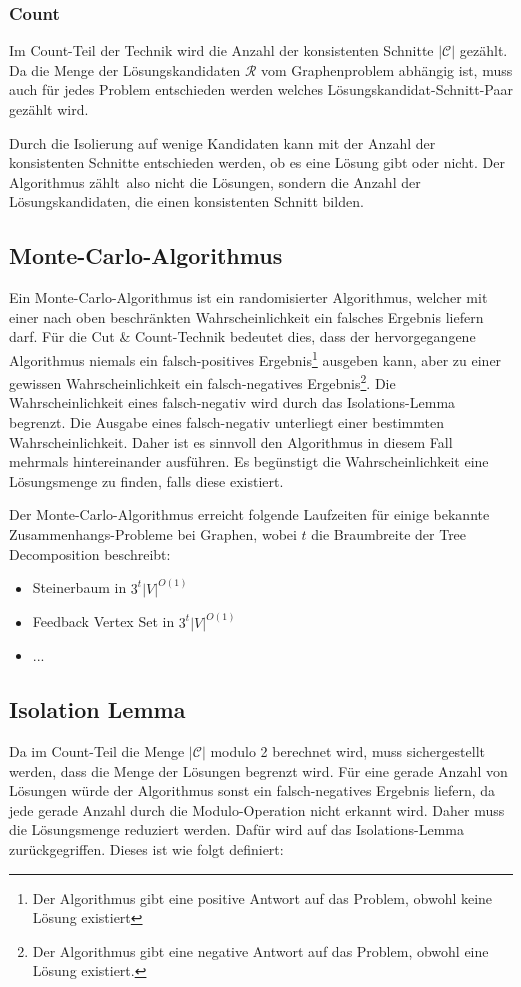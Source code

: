 \subsubsection{Count}
\label{ssec:cc_count}
Im Count-Teil der Technik wird die Anzahl der konsistenten Schnitte $|\mathcal{C}|$ gezählt.
Da die Menge der Lösungskandidaten $\mathcal{R}$ vom Graphenproblem abhängig ist, muss auch für jedes Problem entschieden werden welches Lösungskandidat-Schnitt-Paar gezählt wird.

Durch die Isolierung auf wenige Kandidaten kann mit der Anzahl der konsistenten Schnitte entschieden werden, ob es eine Lösung gibt oder nicht.
Der Algorithmus \glqq zählt\grqq ~also nicht die Lösungen, sondern die Anzahl der Lösungskandidaten, die einen konsistenten Schnitt bilden.

\subsection{Monte-Carlo-Algorithmus}
\label{sec:cc_monte}
Ein Monte-Carlo-Algorithmus ist ein randomisierter Algorithmus, welcher mit einer nach oben beschränkten Wahrscheinlichkeit ein falsches Ergebnis liefern darf. 
Für die Cut \& Count-Technik bedeutet dies, dass der hervorgegangene Algorithmus niemals ein falsch-positives Ergebnis\footnote{Der Algorithmus gibt eine positive Antwort auf das Problem, obwohl keine Lösung existiert} ausgeben kann, aber zu einer gewissen Wahrscheinlichkeit ein falsch-negatives Ergebnis\footnote{Der Algorithmus gibt eine negative Antwort auf das Problem, obwohl eine Lösung existiert.}. 
Die Wahrscheinlichkeit eines falsch-negativ wird durch das Isolations-Lemma begrenzt. 
Die Ausgabe eines falsch-negativ unterliegt einer bestimmten Wahrscheinlichkeit. Daher ist es sinnvoll den Algorithmus in diesem Fall mehrmals hintereinander ausführen. Es begünstigt die Wahrscheinlichkeit eine Lösungsmenge zu finden, falls diese existiert.

Der Monte-Carlo-Algorithmus erreicht folgende Laufzeiten für einige bekannte Zusammenhangs-Probleme bei Graphen, wobei $t$ die Braumbreite der Tree Decomposition beschreibt:
\begin{itemize}
\item Steinerbaum in $3^t |V|^{O(1)}$
\item Feedback Vertex Set in $3^t|V|^{O(1)}$
\item ...
\end{itemize}

\subsection{Isolation Lemma}
\label{sec:cc_iso}
Da im Count-Teil die Menge $|\mathcal{C}|$ modulo 2 berechnet wird, muss sichergestellt werden, dass die Menge der Lösungen begrenzt wird. 
Für eine gerade Anzahl von Lösungen würde der Algorithmus sonst ein falsch-negatives Ergebnis liefern, da jede gerade Anzahl durch die Modulo-Operation nicht erkannt wird. 
Daher muss die Lösungsmenge reduziert werden. Dafür wird auf das Isolations-Lemma zurückgegriffen. Dieses ist wie folgt definiert:

